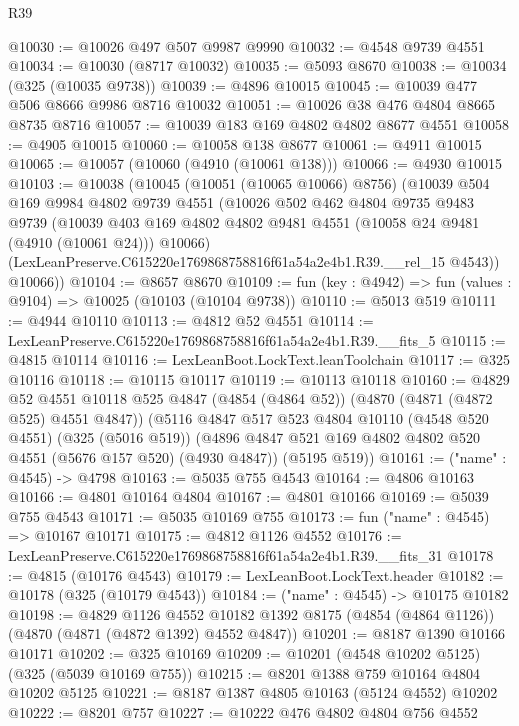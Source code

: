 \begin{lexlean}{R39}
\begin{coremodule}
@10030 := @10026 @497 @507 @9987 @9990
@10032 := @4548 @9739 @4551
@10034 := @10030 (@8717 @10032)
@10035 := @5093 @8670
@10038 := @10034 (@325 (@10035 @9738))
@10039 := @4896 @10015
@10045 := @10039 @477 @506 @8666 @9986 @8716 @10032
@10051 := @10026 @38 @476 @4804 @8665 @8735 @8716
@10057 := @10039 @183 @169 @4802 @4802 @8677 @4551
@10058 := @4905 @10015
@10060 := @10058 @138 @8677
@10061 := @4911 @10015
@10065 := @10057 (@10060 (@4910 (@10061 @138)))
@10066 := @4930 @10015
@10103 := @10038
    (@10045
      (@10051 (@10065 @10066) @8756)
      (@10039
        @504
        @169
        @9984
        @4802
        @9739
        @4551
        (@10026
          @502
          @462
          @4804
          @9735
          @9483
          @9739
          (@10039 @403 @169 @4802 @4802 @9481 @4551 (@10058 @24 @9481 (@4910 (@10061 @24))) @10066)
          (LexLeanPreserve.C615220e1769868758816f61a54a2e4b1.R39.__rel_15 @4543))
        @10066))
@10104 := @8657 @8670
@10109 := fun (key : @4942) => fun (values : @9104) => @10025 (@10103 (@10104 @9738))
@10110 := @5013 @519
@10111 := @4944 @10110
@10113 := @4812 @52 @4551
@10114 := LexLeanPreserve.C615220e1769868758816f61a54a2e4b1.R39.__fits_5
@10115 := @4815 @10114
@10116 := LexLeanBoot.LockText.leanToolchain
@10117 := @325 @10116
@10118 := @10115 @10117
@10119 := @10113 @10118
@10160 := @4829
    @52
    @4551
    @10118
    @525
    @4847
    (@4854 (@4864 @52))
    (@4870 (@4871 (@4872 @525) @4551 @4847))
    (@5116
      @4847
      @517
      @523
      @4804
      @10110
      (@4548 @520 @4551)
      (@325 (@5016 @519))
      (@4896 @4847 @521 @169 @4802 @4802 @520 @4551 (@5676 @157 @520) (@4930 @4847))
      (@5195 @519))
@10161 := ("name" : @4545) -> @4798
@10163 := @5035 @755 @4543
@10164 := @4806 @10163
@10166 := @4801 @10164 @4804
@10167 := @4801 @10166
@10169 := @5039 @755 @4543
@10171 := @5035 @10169 @755
@10173 := fun ("name" : @4545) => @10167 @10171
@10175 := @4812 @1126 @4552
@10176 := LexLeanPreserve.C615220e1769868758816f61a54a2e4b1.R39.__fits_31
@10178 := @4815 (@10176 @4543)
@10179 := LexLeanBoot.LockText.header
@10182 := @10178 (@325 (@10179 @4543))
@10184 := ("name" : @4545) -> @10175 @10182
@10198 := @4829
    @1126
    @4552
    @10182
    @1392
    @8175
    (@4854 (@4864 @1126))
    (@4870 (@4871 (@4872 @1392) @4552 @4847))
@10201 := @8187 @1390 @10166 @10171
@10202 := @325 @10169
@10209 := @10201 (@4548 @10202 @5125) (@325 (@5039 @10169 @755))
@10215 := @8201 @1388 @759 @10164 @4804 @10202 @5125
@10221 := @8187 @1387 @4805 @10163 (@5124 @4552) @10202
@10222 := @8201 @757
@10227 := @10222 @476 @4802 @4804 @756 @4552

\end{coremodule}
\end{lexlean}
